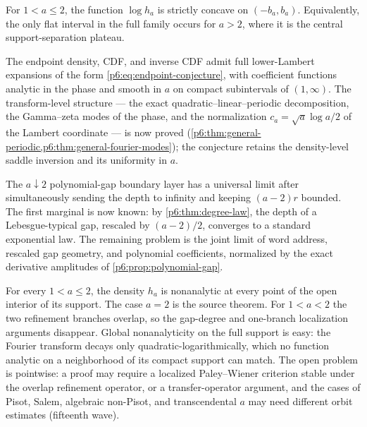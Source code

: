 \documentclass[11pt,oneside]{article}
\numberwithin{equation}{section}
\theoremstyle{definition}
\theoremstyle{remark}
\begin{document}
\begin{conjecture}
For $1<a\le2$, the function $\log h_a$ is strictly concave on
$(-b_a,b_a)$.  Equivalently, the only flat interval in the full family occurs
for $a>2$, where it is the central support-separation plateau.
\end{conjecture}

\begin{conjecture}
The endpoint density, CDF, and inverse CDF admit full lower-Lambert expansions of
the form \eqref{p6:eq:endpoint-conjecture}, with coefficient functions analytic in
the phase and smooth in $a$ on compact subintervals of $(1,\infty)$.
The transform-level structure --- the exact quadratic--linear--periodic
decomposition, the Gamma--zeta modes of the phase, and the normalization
$c_a=\sqrt a\log a/2$ of the Lambert coordinate --- is now proved
(\cref{p6:thm:general-periodic,p6:thm:general-fourier-modes}); the conjecture
retains the density-level saddle inversion and its uniformity in $a$.
\end{conjecture}

\begin{conjecture}
The $a\downarrow2$ polynomial-gap boundary layer has a universal limit after
simultaneously sending the depth to infinity and keeping $(a-2)r$ bounded.
The first marginal is now known: by \cref{p6:thm:degree-law}, the depth of a
Lebesgue-typical gap, rescaled by $(a-2)/2$, converges to a standard
exponential law.  The remaining problem is the joint limit of word address,
rescaled gap geometry, and polynomial coefficients, normalized by the exact
derivative amplitudes of \cref{p6:prop:polynomial-gap}.
\end{conjecture}

\begin{conjecture}
For every $1<a\le2$, the density $h_a$ is nonanalytic at every point of the
open interior of its support.  The case $a=2$ is the source theorem.  For
$1<a<2$ the two refinement branches overlap, so the gap-degree and one-branch
localization arguments disappear.  Global nonanalyticity on the full support
is easy: the Fourier transform decays only quadratic-logarithmically, which no
function analytic on a neighborhood of its compact support can match.  The
open problem is pointwise: a proof may require a localized Paley--Wiener
criterion stable under the overlap refinement operator, or a transfer-operator
argument, and the cases of Pisot, Salem, algebraic non-Pisot, and
transcendental $a$ may need different orbit estimates (fifteenth wave).
\end{conjecture}
\end{document}
